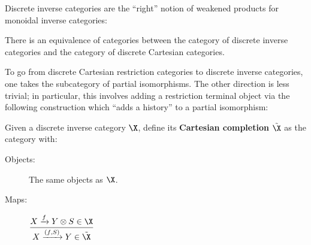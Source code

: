 Discrete inverse categories are the ``right'' notion of weakened products for monoidal inverse categories:

\begin{theorem}\cite[Thm. 5.2.6]{giles}
There is an equivalence of categories between the category of discrete inverse categories and the category of discrete Cartesian categories.
\end{theorem}

To go from  discrete Cartesian restriction categories to discrete inverse categories, one takes the subcategory of partial isomorphisms.
The other direction is less trivial; in particular, this involves adding a restriction terminal object via the following construction which ``adds a history'' to a partial isomorphism:

\begin{definition}\cite[Def. 5.1.1]{giles}
Given a discrete inverse category $\X$, define its {\bf Cartesian completion} $\tilde \X$ as the category with:

\begin{description}
\item[Objects:] The same objects as $\X$.
\item[Maps:]
\hfil
$
\dfrac{ X\xrightarrow{f} Y \otimes S \in \X}{ X\xrightarrow{(f,S)} Y \in \tilde \X}
$




\end{description}
\end{definition}
